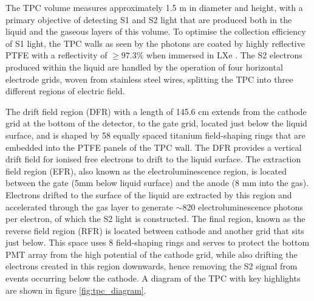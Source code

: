 The TPC volume measures approximately 1.5 m in diameter and height, with a primary objective of detecting S1 and S2 light that are produced both in the liquid and the gaseous layers of this volume. To optimise the collection efficiency of S1 light, the TPC walls as seen by the photons are coated by highly reflective PTFE with a reflectivity of $\geq97.3\%$ when immersed in LXe \cite{Neves_2017}. The S2 electrons produced within the liquid are handled by the operation of four horizontal electrode grids, woven from stainless steel wires, splitting the TPC into three different regions of electric field.

The drift field region (DFR) with a length of 145.6 cm extends from the cathode grid at the bottom of the detector, to the gate grid, located just below the liquid surface, and is shaped by 58 equally spaced titanium field-shaping rings that are embedded into the PTFE panels of the TPC wall. The DFR provides a vertical drift field for ionised free electrons to drift to the liquid surface. The extraction field region (EFR), also known as the electroluminescence region, is located between the gate (5mm below liquid surface) and the anode (8 mm into the gas). Electrons drifted to the surface of the liquid are extracted by this region and accelerated through the gas layer to generate $\sim$820 electroluminescence photons per electron, of which the S2 light is constructed. The final region, known as the reverse field region (RFR) is located between cathode and another grid that sits just below. This space uses 8 field-shaping rings and serves to protect the bottom PMT array from the high potential of the cathode grid, while also drifting the electrons created in this region downwards, hence removing the S2 signal from events occurring below the cathode. A diagram of the TPC with key highlights are shown in figure \ref{fig:tpc_diagram}.

